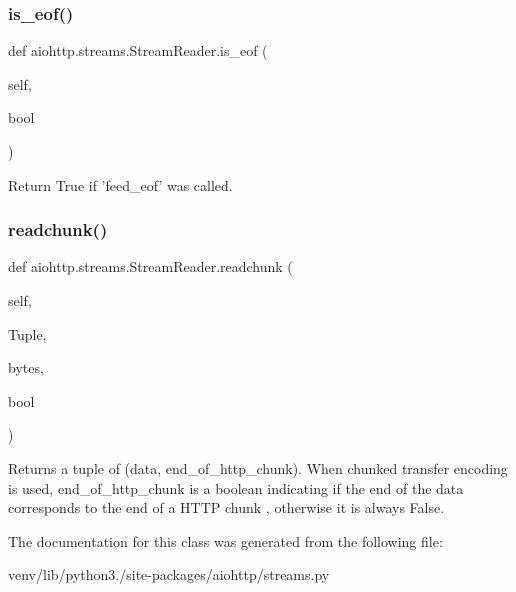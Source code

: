 \subsubsection{\texorpdfstring{is\+\_\+eof()}{is\_eof()}}
{\footnotesize\ttfamily def aiohttp.\+streams.\+Stream\+Reader.\+is\+\_\+eof (\begin{DoxyParamCaption}\item[{}]{self,  }\item[{}]{bool }\end{DoxyParamCaption})}

\begin{DoxyVerb}Return True if  'feed_eof' was called.\end{DoxyVerb}
 \mbox{\label{classaiohttp_1_1streams_1_1_stream_reader_a96e2877cfaf3ce0b5bc35bb8c8777c36}} 
\subsubsection{\texorpdfstring{readchunk()}{readchunk()}}
{\footnotesize\ttfamily def aiohttp.\+streams.\+Stream\+Reader.\+readchunk (\begin{DoxyParamCaption}\item[{}]{self,  }\item[{}]{Tuple,  }\item[{}]{bytes,  }\item[{}]{bool }\end{DoxyParamCaption})}

\begin{DoxyVerb}Returns a tuple of (data, end_of_http_chunk). When chunked transfer
encoding is used, end_of_http_chunk is a boolean indicating if the end
of the data corresponds to the end of a HTTP chunk , otherwise it is
always False.
\end{DoxyVerb}
 

The documentation for this class was generated from the following file\+:\begin{DoxyCompactItemize}
\item 
venv/lib/python3./site-\/packages/aiohttp/streams.\+py\end{DoxyCompactItemize}
